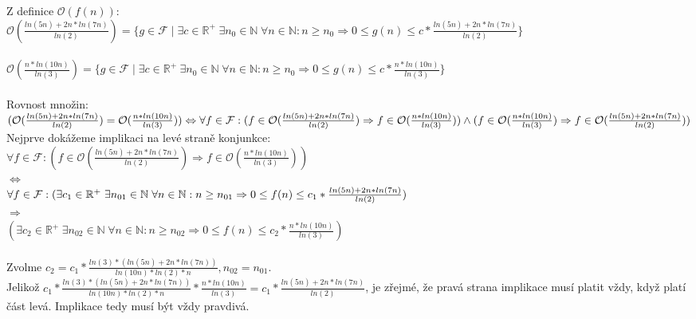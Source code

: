 \documentclass[a4paper,11pt]{article}[24.3.2010]
\begin{document}
\begin{enumerate}
\begin{enumerate}
      Z definice $\mathcal{O}(f(n))$:\\
      $\mathcal{O}(\frac{ln(5n)+2n*ln(7n)}{ln(2)}) = \{g \in \mathcal{F} \mid \exists c \in \mathbb{R}^+ \hspace{3pt} \exists n_{0} \in \mathbb{N} \hspace{3pt} \forall n \in \mathbb{N} : n \geq n_{0} \Rightarrow 0 \leq g(n) \leq c*\frac{ln(5n)+2n*ln(7n)}{ln(2)}\}$\\\\
      $\mathcal{O}(\frac{n*ln(10n)}{ln(3)}) = \{g \in \mathcal{F} \mid \exists c \in \mathbb{R}^+ \hspace{3pt} \exists n_{0} \in \mathbb{N} \hspace{3pt} \forall n \in \mathbb{N} : n \geq n_{0} \Rightarrow 0 \leq g(n) \leq c*\frac{n*ln(10n)}{ln(3)}\}$\\\\
      Rovnost množin:\\
      $(\mathcal{O}(\frac{ln(5n)+2n*ln(7n)}{ln(2)}) = \mathcal{O}(\frac{n*ln(10n)}{ln(3)})) \Leftrightarrow 
\forall f \in \mathcal{F} :\\ (f \in \mathcal{O}(\frac{ln(5n)+2n*ln(7n)}{ln(2)}) \Rightarrow f \in \mathcal{O}(\frac{n*ln(10n)}{ln(3)})) \wedge (f \in \mathcal{O}(\frac{n*ln(10n)}{ln(3)}) \Rightarrow f \in \mathcal{O}(\frac{ln(5n)+2n*ln(7n)}{ln(2)}))$\\

      Nejprve dokážeme implikaci na levé straně konjunkce:\\
      $\forall f \in \mathcal{F} : (f \in \mathcal{O}(\frac{ln(5n)+2n*ln(7n)}{ln(2)}) \Rightarrow f \in \mathcal{O}(\frac{n*ln(10n)}{ln(3)}))$\\
      $\Leftrightarrow$\\
      $\forall f \in \mathcal{F} :\\ (\exists c_{1} \in \mathbb{R}^+ \hspace{3pt} \exists n_{01} \in \mathbb{N} \hspace{3pt} \forall n \in \mathbb{N} : n \geq n_{01} \Rightarrow 0 \leq f(n) \leq c_{1}*\frac{ln(5n)+2n*ln(7n)}{ln(2)})$\\
      $\Rightarrow$\\
      $(\exists c_{2} \in \mathbb{R}^+ \hspace{3pt} \exists n_{02} \in \mathbb{N} \hspace{3pt} \forall n \in \mathbb{N} : n \geq n_{02} \Rightarrow 0 \leq f(n) \leq c_{2}*\frac{n*ln(10n)}{ln(3)})$\\\\
      Zvolme $c_{2}=c_{1}*\frac{ln(3)*(ln(5n)+2n*ln(7n))}{ln(10n)*ln(2)*n},n_{02}=n_{01}$.\\ 
      Jelikož $c_{1}*\frac{ln(3)*(ln(5n)+2n*ln(7n))}{ln(10n)*ln(2)*n}*\frac{n*ln(10n)}{ln(3)}=c_{1}*\frac{ln(5n)+2n*ln(7n)}{ln(2)}$, je zřejmé, že pravá strana implikace musí platit vždy, když platí část levá. Implikace tedy musí být vždy pravdivá.\\
      

\end{enumerate}
\end{enumerate}
\end{document}

